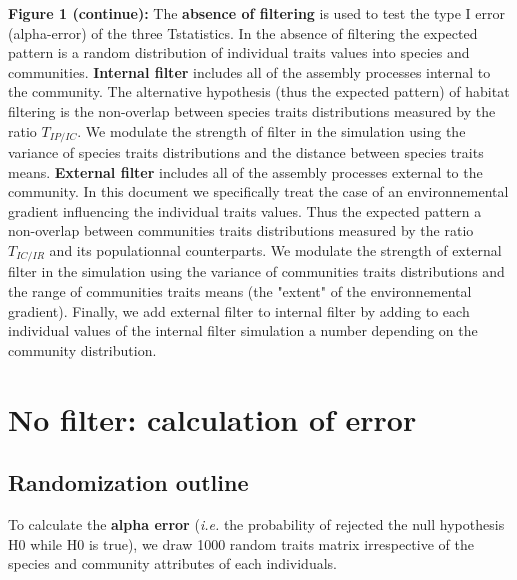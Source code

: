 \documentclass[12pt]{article}\usepackage[]{graphicx}\usepackage[]{color}
\begin{document}
\clearpage
\textbf{Figure 1 (continue):} The \textbf{absence of filtering} is used to test the type I error (alpha-error) of the three Tstatistics. In the absence of filtering the expected pattern is a random distribution of individual traits values into species and communities. \textbf{Internal filter} includes all of the assembly processes internal to the community. The alternative hypothesis (thus the expected pattern) of habitat filtering is the non-overlap between species traits distributions measured by the ratio $T_{IP/IC}$. We modulate the strength of filter in the simulation using the variance of species traits distributions and the distance between species traits means. \textbf{External filter} includes all of the assembly processes external to the community. In this document we specifically treat the case of an environnemental gradient influencing the individual traits values. Thus the expected pattern a non-overlap between communities traits distributions measured by the ratio $T_{IC/IR}$ and its populationnal counterparts. We modulate the strength of external filter in the simulation using the variance of communities traits distributions and the range of communities traits means (the "extent" of the environnemental gradient). Finally, we add external filter to internal filter by adding to each individual values of the internal filter simulation a number depending on the community distribution.
\vspace*{1cm}




\cleardoublepage

\section{No filter: calculation of error}
 \subsection {Randomization outline}

To calculate the \textbf{alpha error} (\textit{i.e.} the probability of rejected the null hypothesis H0 while H0 is true), we draw 1000 random traits matrix irrespective of the species and community attributes of each individuals.
\end{document}
